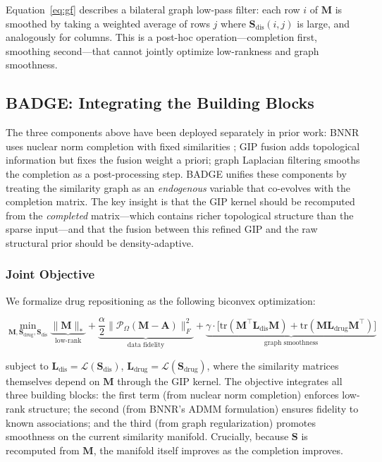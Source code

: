 \documentclass{oup-authoring-template}
\newcommand{\tr}{\mathrm{tr}}
\begin{document}
Equation~\eqref{eq:gf} describes a bilateral graph low-pass filter: each row $i$ of $\mathbf{M}$ is smoothed by taking a weighted average of rows $j$ where $\mathbf{S}_{\text{dis}}(i,j)$ is large, and analogously for columns. This is a post-hoc operation---completion first, smoothing second---that cannot jointly optimize low-rankness and graph smoothness.

\subsection{BADGE: Integrating the Building Blocks}

The three components above have been deployed separately in prior work: BNNR uses nuclear norm completion with fixed similarities \cite{yang2019}; GIP fusion adds topological information but fixes the fusion weight a priori; graph Laplacian filtering smooths the completion as a post-processing step. BADGE unifies these components by treating the similarity graph as an \emph{endogenous} variable that co-evolves with the completion matrix. The key insight is that the GIP kernel should be recomputed from the \emph{completed} matrix---which contains richer topological structure than the sparse input---and that the fusion between this refined GIP and the raw structural prior should be density-adaptive.

\subsubsection{Joint Objective}

We formalize drug repositioning as the following biconvex optimization:

\begin{equation}
\min_{\mathbf{M}, \mathbf{S}_{\text{drug}}, \mathbf{S}_{\text{dis}}} \underbrace{\|\mathbf{M}\|_*}_{\text{low-rank}} + \underbrace{\frac{\alpha}{2}\|\mathcal{P}_\Omega(\mathbf{M} - \mathbf{A})\|_F^2}_{\text{data fidelity}} + \underbrace{\gamma \cdot \big[\tr(\mathbf{M}^\top \mathbf{L}_{\text{dis}} \mathbf{M}) + \tr(\mathbf{M} \mathbf{L}_{\text{drug}} \mathbf{M}^\top)\big]}_{\text{graph smoothness}}
\label{eq:badge_obj}
\end{equation}

subject to $\mathbf{L}_{\text{dis}} = \mathcal{L}(\mathbf{S}_{\text{dis}})$, $\mathbf{L}_{\text{drug}} = \mathcal{L}(\mathbf{S}_{\text{drug}})$, where the similarity matrices themselves depend on $\mathbf{M}$ through the GIP kernel. The objective integrates all three building blocks: the first term (from nuclear norm completion) enforces low-rank structure; the second (from BNNR's ADMM formulation) ensures fidelity to known associations; and the third (from graph regularization) promotes smoothness on the current similarity manifold. Crucially, because $\mathbf{S}$ is recomputed from $\mathbf{M}$, the manifold itself improves as the completion improves.
\end{document}
